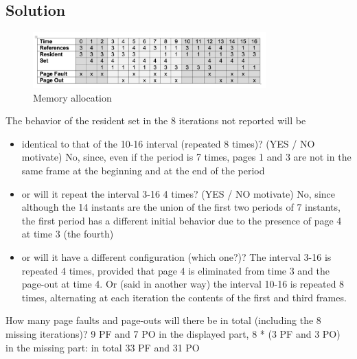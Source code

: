 \subsection{Solution}

\begin{figure}[hbt]
  \centering
  \includegraphics[width=0.8\textwidth]{images/ex08.png}
  \caption{Memory allocation}
\end{figure}

The behavior of the resident set in the 8 iterations not reported will be

\begin{itemize}
\item identical to that of the 10-16 interval (repeated 8 times)? (YES / NO motivate)
No, since, even if the period is 7 times, pages 1 and 3 are not in the same frame at the beginning and at the end of the period
\item or will it repeat the interval 3-16 4 times? (YES / NO motivate)
No, since although the 14 instants are the union of the first two periods of 7 instants, the first period has a different initial behavior due to the presence of page 4 at time 3 (the fourth)
\item or will it have a different configuration (which one?)?
The interval 3-16 is repeated 4 times, provided that page 4 is eliminated from time 3 and the page-out at time 4. Or (said in another way) the interval 10-16 is repeated 8 times, alternating at each iteration the contents of the first and third frames.
\end{itemize}

How many page faults and page-outs will there be in total (including the 8 missing iterations)?
9 PF and 7 PO in the displayed part, 8 * (3 PF and 3 PO) in the missing part: in total 33 PF and 31 PO



